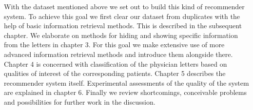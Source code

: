 With the dataset mentioned above we set out to build this kind of recommender system. To achieve this goal we first clear our dataset from duplicates with the help of basic information retrieval methods. This is described in the subsequent chapter. We elaborate on methods for hiding and showing specific information from the letters in chapter 3. For this goal we make extensive use of more advanced information retrieval methods and introduce them alongside there. Chapter 4 is concerned with classification of the physician letters based on qualities of interest of the corresponding patients. Chapter 5 describes the recommender system itself. Experimental assessments of the quality of the system are explained in chapter 6. Finally we review shortcomings, conceivable problems and possibilities for further work in the discussion.

